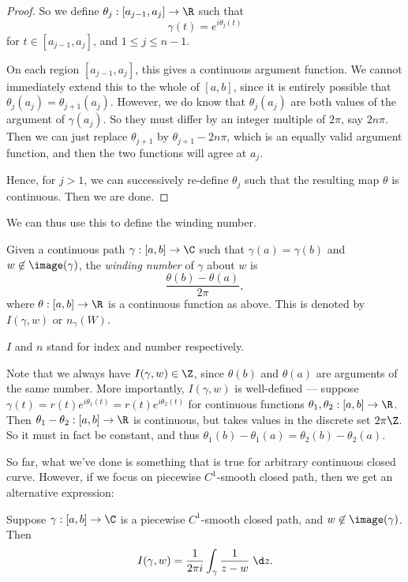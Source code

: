 \documentclass[a4paper]{article}
\begin{document}
\begin{proof}
  So we define $\theta_j: [a_{j - 1}, a_j] \to \R$ such that
  \[
    \gamma(t) = e^{i\theta_j(t)}
  \]
  for $t \in [a_{j - 1}, a_j]$, and $1 \leq j \leq n - 1$.

  On each region $[a_{j - 1}, a_j]$, this gives a continuous argument function. We cannot immediately extend this to the whole of $[a, b]$, since it is entirely possible that $\theta_j(a_j) = \theta_{j + 1}(a_j)$. However, we do know that $\theta_j(a_j)$ are both values of the argument of $\gamma(a_j)$. So they must differ by an integer multiple of $2\pi$, say $2n \pi$. Then we can just replace $\theta_{j + 1}$ by $\theta_{j + 1} - 2n \pi$, which is an equally valid argument function, and then the two functions will agree at $a_j$.

  Hence, for $j > 1$, we can successively re-define $\theta_j$ such that the resulting map $\theta$ is continuous. Then we are done.
\end{proof}

We can thus use this to define the winding number.

\begin{defi}
  Given a continuous path $\gamma: [a, b] \to \C$ such that $\gamma(a) = \gamma(b)$ and $w \not\in \image(\gamma)$, the \emph{winding number} of $\gamma$ about $w$ is
  \[
    \frac{\theta(b) - \theta(a)}{2\pi},
  \]
  where $\theta: [a, b] \to \R$ is a continuous function as above. This is denoted by $I(\gamma, w)$ or $n_\gamma(W)$.
\end{defi}
$I$ and $n$ stand for index and number respectively.

Note that we always have $I(\gamma, w) \in \Z$, since $\theta(b)$ and $\theta(a)$ are arguments of the same number. More importantly, $I(\gamma, w)$ is well-defined --- suppose $\gamma(t) = r(t) e^{i \theta_1(t)} = r(t) e^{i\theta_2(t)}$ for continuous functions $\theta_1, \theta_2: [a, b] \to \R$. Then $\theta_1 - \theta_2 : [a, b] \to \R$ is continuous, but takes values in the discrete set $2\pi \Z$. So it must in fact be constant, and thus $\theta_1(b) - \theta_1(a) = \theta_2(b) - \theta_2(a)$.

So far, what we've done is something that is true for arbitrary continuous closed curve. However, if we focus on piecewise $C^1$-smooth closed path, then we get an alternative expression:
\begin{lemma}
  Suppose $\gamma: [a, b] \to \C$ is a piecewise $C^1$-smooth closed path, and $w \not\in \image(\gamma)$. Then
  \[
    I(\gamma, w) = \frac{1}{2\pi i} \int_\gamma \frac{1}{z - w} \;\d z.
  \]
\end{lemma}
\end{document}
